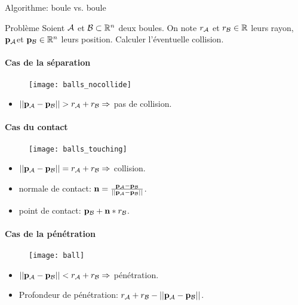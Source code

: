 \begin{frame}{Algorithme: boule vs. boule}
     {
        \begin{block}{Problème}
            Soient $\mathcal{A}$ et $\mathcal{B} \subset \mathbb{R}^n$ deux boules.
            On note $r_{\mathcal{A}}$ et $r_{\mathcal{B}} \in \mathbb{R}$ leurs rayon, ${\bf p_\mathcal{A}}$et ${\bf p_\mathcal{B}} \in
            \mathbb{R}^n$ leurs position.  Calculer l’éventuelle collision.
        \end{block}
    }
     {
     {
        \framesubtitle{Cas de la séparation}
        \begin{figure}[h]
            \texttt{[image: balls\_nocollide]}
        \end{figure}
        \begin{itemize}
            \item $|| {\bf p_\mathcal{A}} - {\bf p_\mathcal{B}} || > r_{\mathcal{A}} + r_{\mathcal{B}} \Rightarrow $ pas de collision.
        \end{itemize}
    }
     {
        \framesubtitle{Cas du contact}
        \begin{figure}[h]
            \texttt{[image: balls\_touching]}
        \end{figure}
        \begin{itemize}
            \item $|| {\bf p_\mathcal{A}} - {\bf p_\mathcal{B}} || = r_{\mathcal{A}} + r_{\mathcal{B}} \Rightarrow $ collision.
            \item normale de contact: ${\bf n} = \frac{{\bf p_\mathcal{A}} - {\bf p_\mathcal{B}}}{|| {\bf p_\mathcal{A}} - {\bf p_\mathcal{B}} ||}$.
            \item point de contact: ${\bf p_\mathcal{B}} + {\bf n} * r_{\mathcal{B}}$.
        \end{itemize}
    }
     {
        \framesubtitle{Cas de la pénétration}
        \begin{figure}[h]
            \texttt{[image: ball]}
        \end{figure}
        \begin{itemize}
            \item $|| {\bf p_\mathcal{A}} - {\bf p_\mathcal{B}} || < r_{\mathcal{A}} + r_{\mathcal{B}} \Rightarrow $ pénétration.\\
            \item Profondeur de pénétration: $r_{\mathcal{A}} + r_{\mathcal{B}} - || {\bf p_\mathcal{A}} - {\bf p_\mathcal{B}} ||$.
        \end{itemize}
    }
    }

\end{frame}

